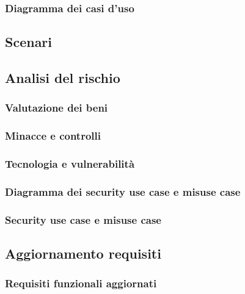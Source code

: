 \documentclass{article}
\begin{document}
\subsubsection{Diagramma dei casi d'uso}


\subsection{Scenari}


\subsection{Analisi del rischio}
\subsubsection{Valutazione dei beni}

\subsubsection{Minacce e controlli}

\subsubsection{Tecnologia e vulnerabilità}

\subsubsection{Diagramma dei security use case e misuse case}

\subsubsection{Security use case e misuse case}


\subsection{Aggiornamento requisiti}
\subsubsection{Requisiti funzionali aggiornati}

\end{document}
